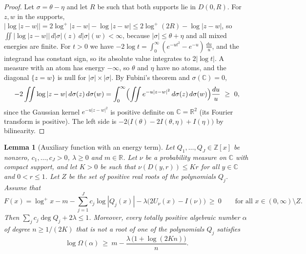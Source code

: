 \documentclass[11pt]{amsart}
\newtheorem{lemma}[theorem]{Lemma}
\theoremstyle{remark}
\numberwithin{equation}{section}
\newcommand{\R}{\mathbb{R}}
\newcommand{\Z}{\mathbb{Z}}
\newcommand{\C}{\mathbb{C}}
\newcommand{\logp}{\log^{+}}
\begin{document}
\begin{proof}
Let $\sigma=\theta-\eta$ and let $R$ be such that both supports lie in $D(0,R)$. For $z,w$ in the supports, $|\log|z-w||=2\logp|z-w|-\log|z-w|\le2\log^+(2R)-\log|z-w|$, so $\iint|\log|z-w||\,d|\sigma|(z)\,d|\sigma|(w)<\infty$, because $|\sigma|\le\theta+\eta$ and all mixed energies are finite. For $t>0$ we have $-2\log t=\int_0^\infty(e^{-ut^2}-e^{-u})\,\frac{du}u$, and the integrand has constant sign, so its absolute value integrates to $2|\log t|$. A measure with an atom has energy $-\infty$, so $\theta$ and $\eta$ have no atoms, and the diagonal $\{z=w\}$ is null for $|\sigma|\times|\sigma|$. By Fubini's theorem and $\sigma(\C)=0$,
\[
-2\iint\log|z-w|\,d\sigma(z)\,d\sigma(w)=\int_0^\infty\Bigl(\iint e^{-u|z-w|^2}\,d\sigma(z)\,d\sigma(w)\Bigr)\frac{du}u\ \ge\ 0,
\]
since the Gaussian kernel $e^{-u|z-w|^2}$ is positive definite on $\C=\R^2$ (its Fourier transform is positive). The left side is $-2\bigl(I(\theta)-2I(\theta,\eta)+I(\eta)\bigr)$ by bilinearity.
\end{proof}

\begin{lemma}[Auxiliary function with an energy term]\label{lem:aux}
Let $Q_1,\dots,Q_J\in\Z[x]$ be nonzero, $c_1,\dots,c_J>0$, $\lambda\ge0$ and $m\in\R$. Let $\nu$ be a probability measure on $\C$ with compact support, and let $K>0$ be such that $\nu(D(y,r))\le Kr$ for all $y\in\C$ and $0<r\le1$. Let $Z$ be the set of positive real roots of the polynomials $Q_j$. Assume that
\begin{equation}\label{eq:F}
F(x)=\logp x-m-\sum_{j=1}^Jc_j\log|Q_j(x)|-\lambda\bigl(2U_\nu(x)-I(\nu)\bigr)\ \ge\ 0\qquad\text{for all }x\in(0,\infty)\setminus Z.
\end{equation}
Then $\sum_jc_j\deg Q_j+2\lambda\le1$. Moreover, every totally positive algebraic number $\alpha$ of degree $n\ge1/(2K)$ that is not a root of one of the polynomials $Q_j$ satisfies
\begin{equation}\label{eq:eff}
\log\Omega(\alpha)\ \ge\ m-\frac{\lambda\,\bigl(1+\log(2Kn)\bigr)}{n}.
\end{equation}
\end{lemma}
\end{document}
